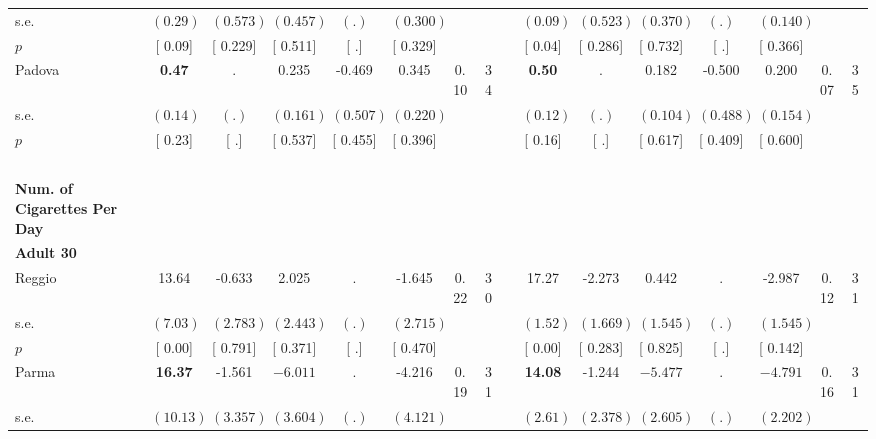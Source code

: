 \begin{longtable}{L{8em} c c c c c c c p{1em} c c c c c c c}
\quad \quad \quad \quad s.e.& $ (     0.29)$ & $ (    0.573)$ & $ (    0.457)$ & $ (        .)$ & $ (    0.300)$ & & & & $ (     0.09)$ & $ (    0.523)$ & $ (    0.370)$ & $ (        .)$ & $ (    0.140)$ & &  \\*
\quad \quad \quad \quad $ p$ & [     0.09] & [    0.229] & [    0.511] & [        .] & [    0.329] & & & & [     0.04] & [    0.286] & [    0.732] & [        .] & [    0.366] & &  \\[1em]
\quad \quad \quad Padova& \textbf{     0.47} &         . &     0.235 &    -0.469 &     0.345 &      0.10 &        34 & & \textbf{     0.50} &         . &     0.182 &    -0.500 &     0.200 &      0.07 &        35  \\*
\quad \quad \quad \quad s.e.& $ (     0.14)$ & $ (        .)$ & $ (    0.161)$ & $ (    0.507)$ & $ (    0.220)$ & & & & $ (     0.12)$ & $ (        .)$ & $ (    0.104)$ & $ (    0.488)$ & $ (    0.154)$ & &  \\*
\quad \quad \quad \quad $ p$ & [     0.23] & [        .] & [    0.537] & [    0.455] & [    0.396] & & & & [     0.16] & [        .] & [    0.617] & [    0.409] & [    0.600] & &  \\[1em]
~\\[1em]
\textbf{Num. of Cigarettes Per Day} \\*
\quad \quad \textbf{Adult 30} & & & & & & & & & & & & & & & \\* 
\quad \quad \quad Reggio& 13.64 &    -0.633 &     2.025 &         . &    -1.645 &      0.22 &        30 & & 17.27 &    -2.273 &     0.442 &         . &    -2.987 &      0.12 &        31  \\*
\quad \quad \quad \quad s.e.& $ (     7.03)$ & $ (    2.783)$ & $ (    2.443)$ & $ (        .)$ & $ (    2.715)$ & & & & $ (     1.52)$ & $ (    1.669)$ & $ (    1.545)$ & $ (        .)$ & $ (    1.545)$ & &  \\*
\quad \quad \quad \quad $ p$ & [     0.00] & [    0.791] & [    0.371] & [        .] & [    0.470] & & & & [     0.00] & [    0.283] & [    0.825] & [        .] & [    0.142] & &  \\[1em]
\quad \quad \quad Parma& \textbf{    16.37} &    -1.561 & $ \mathbf{   -6.011}$ &         . &    -4.216 &      0.19 &        31 & & \textbf{    14.08} &    -1.244 & $ \mathbf{   -5.477}$ &         . & $ \mathbf{   -4.791}$ &      0.16 &        31  \\*
\quad \quad \quad \quad s.e.& $ (    10.13)$ & $ (    3.357)$ & $ (    3.604)$ & $ (        .)$ & $ (    4.121)$ & & & & $ (     2.61)$ & $ (    2.378)$ & $ (    2.605)$ & $ (        .)$ & $ (    2.202)$ & &  \\*

\end{longtable}
